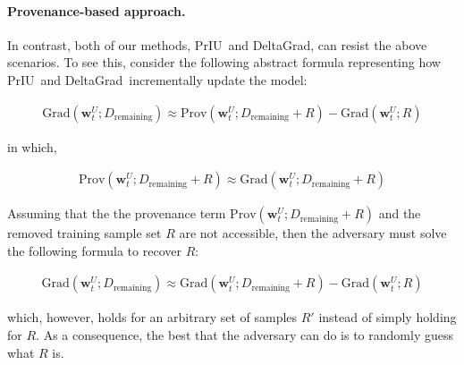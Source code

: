 \documentclass[11pt]{article}
\newcommand{\priu}{PrIU}
\newcommand{\deltagrad}{DeltaGrad}
\newcommand{\uw}{\textbf{w}^{U}}
\begin{document}
\paragraph{Provenance-based approach.}
In contrast, both of our methods, \priu\ and \deltagrad, can resist the above scenarios. To see this, consider the following abstract formula representing how \priu\ and \deltagrad\ incrementally update the model:
\begin{small}
\begin{align}
    \text{Grad}(\uw_t; D_{\text{remaining}}) \approx \text{Prov}(\uw_t; D_{\text{remaining}} + R) - \text{Grad} (\uw_t; R)
\end{align}
\end{small}
\noindent
in which,
\begin{small}
\begin{align*}
    \text{Prov}(\uw_t; D_{\text{remaining}} + R) \approx \text{Grad} (\uw_t; D_{\text{remaining}} + R)
\end{align*}
\end{small}


Assuming that the the provenance term $\text{Prov}(\uw_t; D_{\text{remaining}} + R)$ and the removed training sample set $R$ are not accessible, then the adversary must solve the following formula to recover $R$:
\begin{small}
\begin{align}
    \text{Grad}(\uw_t; D_{\text{remaining}}) \approx \text{Grad}(\uw_t; D_{\text{remaining}} + R) - \text{Grad} (\uw_t; R)
\end{align}
\end{small}
\noindent
which, however, holds for an arbitrary set of samples $R'$ instead of simply holding for $R$. As a consequence, the best that the adversary can do is to randomly guess what $R$ is.


\end{document}
